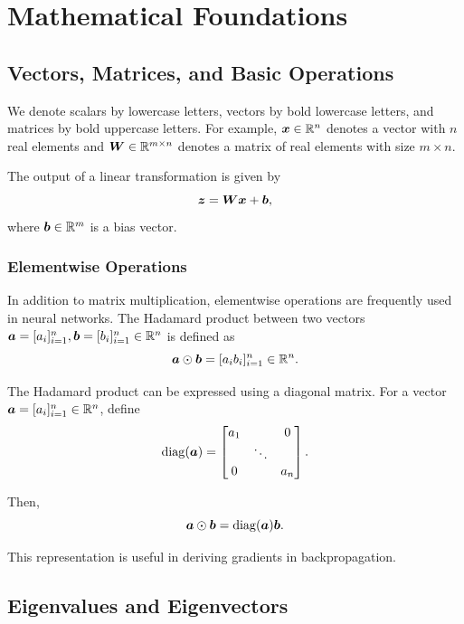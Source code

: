 \chapter{Mathematical Foundations}

\section{Vectors, Matrices, and Basic Operations}

We denote scalars by lowercase letters, vectors by bold lowercase letters, and matrices by bold uppercase letters. For example, $\bm{x} \in \mathbb{R}^n$ denotes a vector with $n$ real elements and $\bm{W} \in \mathbb{R}^{m \times n}$ denotes a matrix of real elements with size $m \times n$.

The output of a linear transformation is given by
\[
    \bm{z} = \bm{W}\bm{x} + \bm{b},
\]
where $\bm{b} \in \mathbb{R}^m$ is a bias vector.


\subsection{Elementwise Operations}

In addition to matrix multiplication, elementwise operations are frequently used in neural networks. The Hadamard product between two vectors $\bm{a} = [a_i]_{i=1}^n, \bm{b} = [b_i]_{i=1}^n \in \mathbb{R}^n$ is defined as
\[
    \bm{a} \odot \bm{b} = [a_i b_i]_{i=1}^n \in \mathbb{R}^n.
\]

The Hadamard product can be expressed using a diagonal matrix. For a vector $\bm{a} = [a_i]_{i=1}^n \in \mathbb{R}^n$, define
\[
    \operatorname{diag}(\bm{a}) =
    \begin{bmatrix}
        a_1 &        & 0   \\
            & \ddots &     \\
        0   &        & a_n
    \end{bmatrix}.
\]

Then,
\begin{equation} \label{eq:hadamard-diagonal-rep}
    \bm{a} \odot \bm{b} = \operatorname{diag}(\bm{a}) \bm{b}.
\end{equation}

This representation is useful in deriving gradients in backpropagation.


\section{Eigenvalues and Eigenvectors}

